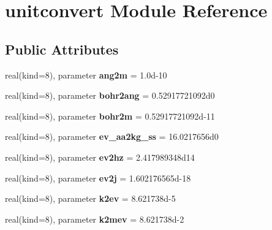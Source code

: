 \hypertarget{classunitconvert}{\section{unitconvert Module Reference}
\label{classunitconvert}
}
\subsection*{Public Attributes}
\begin{DoxyCompactItemize}
\item 
\hypertarget{classunitconvert_ad5283f67b0cacb7fbdcdd7eb5f43890f}{real(kind=8), parameter {\bfseries ang2m} = 1.\-0d-\/10}\label{classunitconvert_ad5283f67b0cacb7fbdcdd7eb5f43890f}

\item 
\hypertarget{classunitconvert_a347ea8541f4173f6996a3f3fb832c803}{real(kind=8), parameter {\bfseries bohr2ang} = 0.\-52917721092d0}\label{classunitconvert_a347ea8541f4173f6996a3f3fb832c803}

\item 
\hypertarget{classunitconvert_a9fab888903c916236ef87524b8f78360}{real(kind=8), parameter {\bfseries bohr2m} = 0.\-52917721092d-\/11}\label{classunitconvert_a9fab888903c916236ef87524b8f78360}

\item 
\hypertarget{classunitconvert_a555f34a7505f9cca8a7985a93fb703ed}{real(kind=8), parameter {\bfseries ev\-\_\-aa2kg\-\_\-ss} = 16.\-0217656d0}\label{classunitconvert_a555f34a7505f9cca8a7985a93fb703ed}

\item 
\hypertarget{classunitconvert_a3ea1557c45d5888e177a93fb98d6e355}{real(kind=8), parameter {\bfseries ev2hz} = 2.\-417989348d14}\label{classunitconvert_a3ea1557c45d5888e177a93fb98d6e355}

\item 
\hypertarget{classunitconvert_acae31130946be689d3101acdb7f236c1}{real(kind=8), parameter {\bfseries ev2j} = 1.\-602176565d-\/18}\label{classunitconvert_acae31130946be689d3101acdb7f236c1}

\item 
\hypertarget{classunitconvert_a1d761ce6a46e0e6f8a3a86a48f8fefe1}{real(kind=8), parameter {\bfseries k2ev} = 8.\-621738d-\/5}\label{classunitconvert_a1d761ce6a46e0e6f8a3a86a48f8fefe1}

\item 
\hypertarget{classunitconvert_abcab9a7a1c7ae5cff16cb4eca0132982}{real(kind=8), parameter {\bfseries k2mev} = 8.\-621738d-\/2}\label{classunitconvert_abcab9a7a1c7ae5cff16cb4eca0132982}


\end{DoxyCompactItemize}
